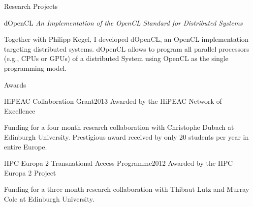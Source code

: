 \documentclass[letterpaper]{resume} %
\begin{document}
\begin{rSection}{Research Projects}
\begin{rSubsection}{dOpenCL}
                   {\hspace{-10em}\emph{An Implementation of the OpenCL Standard for Distributed Systems}\hfill}{}{}
  \item Together with Philipp Kegel, I developed dOpenCL, an OpenCL
    implementation targeting distributed systems. dOpenCL allows to program all
    parallel processors (e.g., CPUs or GPUs) of a distributed System using OpenCL
    as the single programming model.
\end{rSubsection}

\end{rSection}

\begin{rSection}{Awards}

\begin{rSubsection}{HiPEAC Collaboration Grant}{2013}
                   {Awarded by the HiPEAC Network of Excellence}{}
  \item Funding for a four month research collaboration with Christophe Dubach at Edinburgh University.
    Prestigious award received by only 20 students per year in entire Europe.
\end{rSubsection}

\begin{rSubsection}{HPC-Europa 2 Transnational Access Programme}{2012}
                   {Awarded by the HPC-Europa 2 Project}{}
  \item Funding for a three month research collaboration with Thibaut Lutz and Murray Cole at Edinburgh University.
\end{rSubsection}
\vspace{3em}

\end{rSection}
\end{document}
